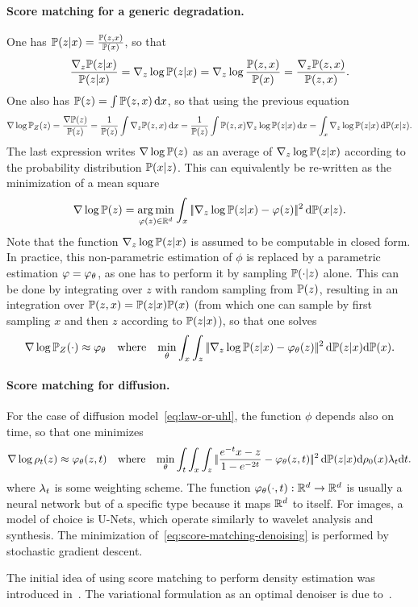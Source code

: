 \paragraph{Score matching for a generic degradation. }
%
One has $\mathbb{P}(z|x) = \frac{\mathbb{P}(z,x)}{\mathbb{P}(x)}$, so that 
\begin{equation*}
	\frac{\nabla_z \mathbb{P}(z|x)}{\mathbb{P}(z|x)} = \nabla_z \log \mathbb{P}(z|x) = \nabla_z \log \frac{\mathbb{P}(z,x)}{\mathbb{P}(x)} = \frac{\nabla_z \mathbb{P}(z,x)}{\mathbb{P}(z,x)}.
\end{equation*}
One also has $\mathbb{P}(z) = \int \mathbb{P}(z,x) \, \mathrm{d} x$, so that using the previous equation
\begin{equation*}
	\nabla \log \mathbb{P}_Z(z) = 
	\frac{ \nabla \mathbb{P}(z) }{\mathbb{P}(z)}  = \frac{1}{\mathbb{P}(z)} \int \nabla_z \mathbb{P}(z,x) \, \mathrm{d} x = \frac{1}{\mathbb{P}(z)} \int \mathbb{P}(z,x) \nabla_z \log \mathbb{P}(z|x)  \, \mathrm{d} x
	= \int_x \nabla_z \log \mathbb{P}(z|x)  \, \mathrm{d} \mathbb{P}(x|z).
\end{equation*}
The last expression writes $\nabla \log \mathbb{P}(z)$ as an average of $\nabla_z \log \mathbb{P}(z|x)$ according to the probability distribution $\mathbb{P}(x|z)$. 
%
This can equivalently be re-written as the minimization of a mean square
\begin{equation*}
	\nabla \log \mathbb{P}(z) = \underset{\varphi(z) \in \mathbb{R}^d}{\arg\min} \int_x |\!| \nabla_z \log \mathbb{P}(z|x)  - \varphi(z) |\!|^2 \, \mathrm{d} \mathbb{P}(x|z).
\end{equation*}
Note that the function $\nabla_z \log \mathbb{P}(z|x)$ is assumed to be computable in closed form. 
%
In practice, this non-parametric estimation of $\phi$ is replaced by a parametric estimation $\varphi=\varphi_\theta$, as one has to perform it by sampling $\mathbb{P}(\cdot|z)$ alone. This can be done by integrating over $z$ with random sampling from $\mathbb{P}(z)$, resulting in an integration over $\mathbb{P}(z,x)=\mathbb{P}(z|x) \mathbb{P}(x)$ (from which one can sample by first sampling $x$ and then $z$ according to $\mathbb{P}(z|x)$), so that one solves
\begin{equation}\label{eq:score-matching-denoising}
	\nabla \log \mathbb{P}_Z(\cdot) \approx \varphi_\theta 
	\quad \text{where} \quad	
	\underset{\theta}{\min}
	 \int_x \int_z |\!| \nabla_z \log \mathbb{P}(z|x)  - \varphi_\theta(z) |\!|^2 \, \mathrm{d} \mathbb{P}(z|x) \mathrm{d} \mathbb{P}(x).
\end{equation}


\paragraph{Score matching for diffusion. }
%
For the case of diffusion model~\eqref{eq:law-or-uhl}, the function $\phi$ depends also on time, so that one minimizes
\begin{equation}\label{eq:score-matching-denoising}
	\nabla \log \rho_t(z) \approx \varphi_\theta(z,t) 
	\quad \text{where} \quad	
	\underset{\theta}{\min} \int_t \int_x \int_z |\!| \frac{e^{-t} x - z}{1-e^{-2t}}  - \varphi_\theta(z,t) |\!|^2 \, \mathrm{d} \mathbb{P}(z|x) \mathrm{d} \rho_0(x) \lambda_t \mathrm{d} t.
\end{equation}
where $\lambda_t$ is some weighting scheme. 
%
The function $\varphi_\theta(\cdot,t) : \mathbb{R}^d \rightarrow \mathbb{R}^d$ is usually a neural network but of a specific type because it maps $\mathbb{R}^d$ to itself. For images, a model of choice is U-Nets, which operate similarly to wavelet analysis and synthesis. The minimization of~\eqref{eq:score-matching-denoising} is performed by stochastic gradient descent.
 
The initial idea of using score matching to perform density estimation was introduced in~\cite{hyvarinen2005estimation}. The variational formulation as an optimal denoiser is due to~\cite{vincent2011connection}. 


